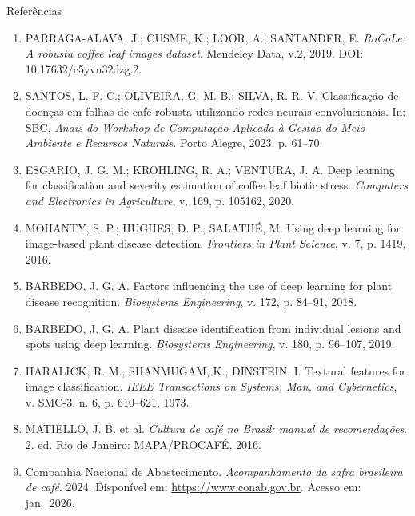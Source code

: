 \documentclass[aspectratio=169,10pt]{beamer}
\begin{document}
\begin{frame}[allowframebreaks]{Referências}
  \footnotesize
  \begin{enumerate}
    \item PARRAGA-ALAVA, J.; CUSME, K.; LOOR, A.; SANTANDER, E. \textit{RoCoLe: A robusta coffee leaf images dataset}. Mendeley Data, v.2, 2019. DOI: 10.17632/c5yvn32dzg.2.

    \item SANTOS, L. F. C.; OLIVEIRA, G. M. B.; SILVA, R. R. V. Classificação de doenças em folhas de café robusta utilizando redes neurais convolucionais. In: SBC, \textit{Anais do Workshop de Computação Aplicada à Gestão do Meio Ambiente e Recursos Naturais}. Porto Alegre, 2023. p. 61--70.

    \item ESGARIO, J. G. M.; KROHLING, R. A.; VENTURA, J. A. Deep learning for classification and severity estimation of coffee leaf biotic stress. \textit{Computers and Electronics in Agriculture}, v. 169, p. 105162, 2020.

    \item MOHANTY, S. P.; HUGHES, D. P.; SALATHÉ, M. Using deep learning for image-based plant disease detection. \textit{Frontiers in Plant Science}, v. 7, p. 1419, 2016.

    \item BARBEDO, J. G. A. Factors influencing the use of deep learning for plant disease recognition. \textit{Biosystems Engineering}, v. 172, p. 84--91, 2018.

    \item BARBEDO, J. G. A. Plant disease identification from individual lesions and spots using deep learning. \textit{Biosystems Engineering}, v. 180, p. 96--107, 2019.

    \item HARALICK, R. M.; SHANMUGAM, K.; DINSTEIN, I. Textural features for image classification. \textit{IEEE Transactions on Systems, Man, and Cybernetics}, v. SMC-3, n. 6, p. 610--621, 1973.

    \item MATIELLO, J. B. et al. \textit{Cultura de café no Brasil: manual de recomendações}. 2. ed. Rio de Janeiro: MAPA/PROCAFÉ, 2016.

    \item Companhia Nacional de Abastecimento. \textit{Acompanhamento da safra brasileira de café}. 2024. Disponível em: \url{https://www.conab.gov.br}. Acesso em: jan.\ 2026.
  \end{enumerate}
\end{frame}
\end{document}
